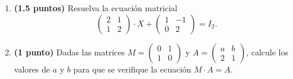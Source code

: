 
\begin{enumerate}[label=\alph*)]
\item \textbf{(1.5 puntos)} Resuelva la ecuación matricial
\[
\begin{pmatrix}2&1\\1&2\end{pmatrix}\cdot X+\begin{pmatrix}1&-1\\0&2\end{pmatrix}=I_2.
\]
\item \textbf{(1 punto)} Dadas las matrices $M=\begin{pmatrix}0&1\\1&0\end{pmatrix}$ y $A=\begin{pmatrix}a&b\\2&1\end{pmatrix}$, calcule los valores de $a$ y $b$ para que se verifique la ecuación $M\cdot A=A$.
\end{enumerate}
